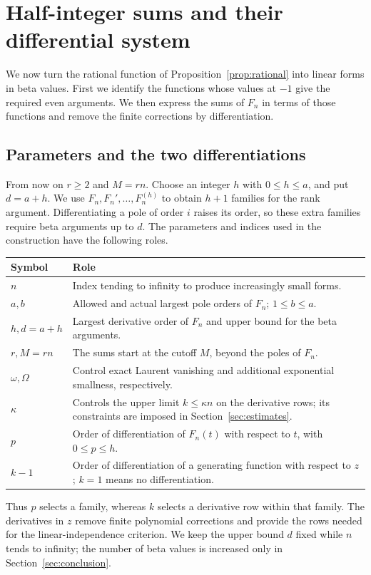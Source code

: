 \section{Half-integer sums and their differential system}\label{sec:forms}

We now turn the rational function of Proposition~\ref{prop:rational}
into linear forms in beta values. First we identify the functions whose
values at $-1$ give the required even arguments. We then express the sums
of $F_n$ in terms of those functions and remove the finite corrections
by differentiation.

\subsection{Parameters and the two differentiations}

From now on $r\geq2$ and $M=rn$. Choose an integer $h$ with
$0\leq h\leq a$, and put $d=a+h$.
We use $F_n,F_n',\ldots,F_n^{(h)}$ to obtain $h+1$ families for the
rank argument. Differentiating a pole of order $i$ raises its order,
so these extra families require beta arguments up to $d$.
The parameters and indices used in the construction have the following roles.
\begin{center}
\begin{tabular}{@{}p{}p{}@{}}
\toprule
Symbol & Role\\
\midrule
$n$ & Index tending to infinity to produce increasingly small forms.\\
$a,b$ & Allowed and actual largest pole orders of $F_n$; $1\leq b\leq a$.\\
$h,d=a+h$ & Largest derivative order of $F_n$ and upper bound for the beta arguments.\\
$r,M=rn$ & The sums start at the cutoff $M$, beyond the poles of $F_n$.\\
$\omega,\Omega$ & Control exact Laurent vanishing and additional exponential smallness, respectively.\\
$\kappa$ & Controls the upper limit $k\leq\kappa n$ on the derivative rows; its constraints are imposed in Section~\ref{sec:estimates}.\\
$p$ & Order of differentiation of $F_n(t)$ with respect to $t$, with $0\leq p\leq h$.\\
$k-1$ & Order of differentiation of a generating function with respect to $z$; $k=1$ means no differentiation.\\
\bottomrule
\end{tabular}
\end{center}
Thus $p$ selects a family, whereas $k$ selects a derivative row within
that family. The derivatives in $z$ remove finite polynomial corrections
and provide the rows needed for the linear-independence criterion.
We keep the upper bound $d$ fixed while $n$ tends to infinity; the
number of beta values is increased only in Section~\ref{sec:conclusion}.

